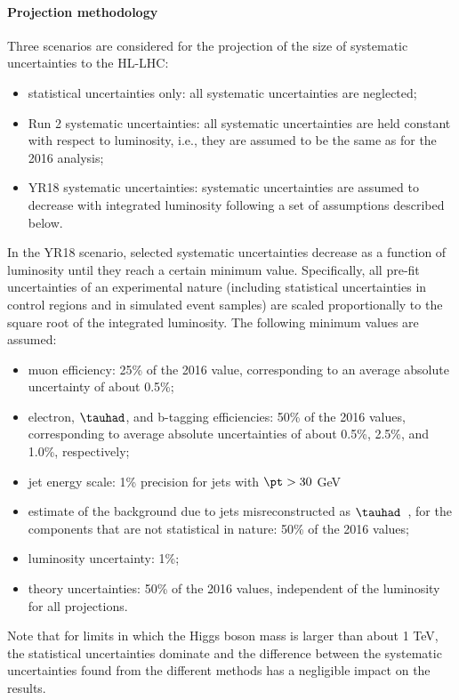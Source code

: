 \paragraph{Projection methodology}
\label{sec:method}
%
Three scenarios are considered for the projection of the size of
systematic uncertainties to the HL-LHC:
\begin{itemize}
\item
statistical uncertainties only: all systematic uncertainties are neglected;
\item
  Run 2 systematic uncertainties: all systematic uncertainties are held
  constant with respect to luminosity, i.e., they are assumed to be
  the same as for the 2016 analysis;
\item
  YR18 systematic uncertainties: systematic uncertainties are assumed to
  decrease with integrated luminosity
  following a set of assumptions described below.
\end{itemize}

In the YR18 scenario,
selected systematic uncertainties decrease
as a function of luminosity until they reach a certain minimum value. 
Specifically, all pre-fit uncertainties of an experimental nature
(including statistical uncertainties in control regions and
in simulated event samples) 
are scaled proportionally to the square root of the integrated luminosity.
The following minimum values are assumed:
\vspace{-0.2cm}
\begin{itemize}
\item
muon efficiency: 25\% of the 2016 value, corresponding to an average absolute uncertainty of about 0.5\%; 
\item
electron, $\tauhad$, and b-tagging efficiencies: 50\% of the 2016 values, 
corresponding to average absolute uncertainties
of about 0.5\%, 2.5\%, and 1.0\%, respectively;
\item
jet energy scale: 1\% precision for jets with $\pt > 30$ GeV%
\item
  estimate of the background due to jets misreconstructed
  as $\tauhad$~\cite{HIG-15-007},
  for the components that are not statistical in nature:
  50\% of the 2016 values;
\item
luminosity uncertainty: 1\%;
\item
  theory uncertainties: 50\% of the 2016 values,
  independent of the luminosity for all projections.
\end{itemize}
Note that for limits in which the Higgs boson mass is larger than about 1 TeV,
the statistical uncertainties dominate and
the difference between the systematic uncertainties found from
the different methods has a negligible impact on the results.

